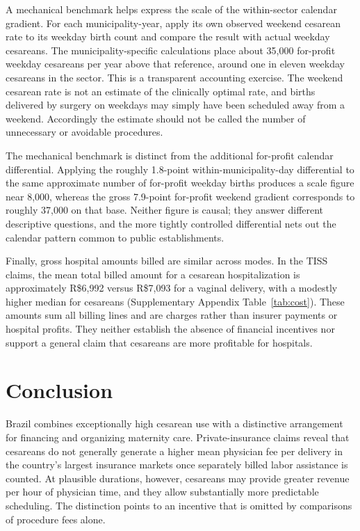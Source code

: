 \documentclass[12pt]{article}
\newcommand{\satab}[1]{Supplementary Appendix Table~\ref{#1}}
\begin{document}
A mechanical benchmark helps express the scale of the within-sector calendar gradient. For each municipality-year, apply its own observed weekend cesarean rate to its weekday birth count and compare the result with actual weekday cesareans. The municipality-specific calculations place about 35,000 for-profit weekday cesareans per year above that reference, around one in eleven weekday cesareans in the sector. This is a transparent accounting exercise. The weekend cesarean rate is not an estimate of the clinically optimal rate, and births delivered by surgery on weekdays may simply have been scheduled away from a weekend. Accordingly the estimate should not be called the number of unnecessary or avoidable procedures.

The mechanical benchmark is distinct from the additional for-profit calendar differential. Applying the roughly 1.8-point within-municipality-day differential to the same approximate number of for-profit weekday births produces a scale figure near 8,000, whereas the gross 7.9-point for-profit weekend gradient corresponds to roughly 37,000 on that base. Neither figure is causal; they answer different descriptive questions, and the more tightly controlled differential nets out the calendar pattern common to public establishments.

Finally, gross hospital amounts billed are similar across modes. In the TISS claims, the mean total billed amount for a cesarean hospitalization is approximately R\$6,992 versus R\$7,093 for a vaginal delivery, with a modestly higher median for cesareans (\satab{tab:cost}). These amounts sum all billing lines and are charges rather than insurer payments or hospital profits. They neither establish the absence of financial incentives nor support a general claim that cesareans are more profitable for hospitals.

\section{Conclusion}\label{sec:conclusion}

Brazil combines exceptionally high cesarean use with a distinctive arrangement for financing and organizing maternity care. Private-insurance claims reveal that cesareans do not generally generate a higher mean physician fee per delivery in the country's largest insurance markets once separately billed labor assistance is counted. At plausible durations, however, cesareans may provide greater revenue per hour of physician time, and they allow substantially more predictable scheduling. The distinction points to an incentive that is omitted by comparisons of procedure fees alone.
\end{document}
